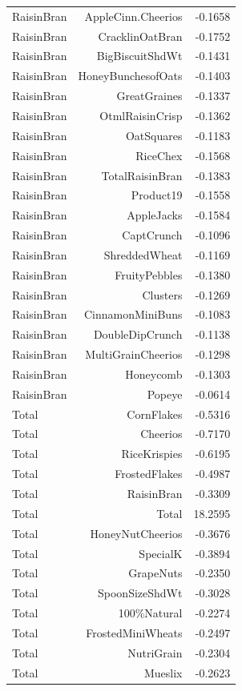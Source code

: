 \begin{longtable}{@{}lrr@{}}
RaisinBran & AppleCinn.Cheerios & -0.1658 \\
RaisinBran & CracklinOatBran & -0.1752 \\
RaisinBran & BigBiscuitShdWt & -0.1431 \\
RaisinBran & HoneyBunchesofOats & -0.1403 \\
RaisinBran & GreatGraines & -0.1337 \\
RaisinBran & OtmlRaisinCrisp & -0.1362 \\
RaisinBran & OatSquares & -0.1183 \\
RaisinBran & RiceChex & -0.1568 \\
RaisinBran & TotalRaisinBran & -0.1383 \\
RaisinBran & Product19 & -0.1558 \\
RaisinBran & AppleJacks & -0.1584 \\
RaisinBran & CaptCrunch & -0.1096 \\
RaisinBran & ShreddedWheat & -0.1169 \\
RaisinBran & FruityPebbles & -0.1380 \\
RaisinBran & Clusters & -0.1269 \\
RaisinBran & CinnamonMiniBuns & -0.1083 \\
RaisinBran & DoubleDipCrunch & -0.1138 \\
RaisinBran & MultiGrainCheerios & -0.1298 \\
RaisinBran & Honeycomb & -0.1303 \\
RaisinBran & Popeye & -0.0614 \\
Total & CornFlakes & -0.5316 \\
Total & Cheerios & -0.7170 \\
Total & RiceKrispies & -0.6195 \\
Total & FrostedFlakes & -0.4987 \\
Total & RaisinBran & -0.3309 \\
Total & Total & 18.2595 \\
Total & HoneyNutCheerios & -0.3676 \\
Total & SpecialK & -0.3894 \\
Total & GrapeNuts & -0.2350 \\
Total & SpoonSizeShdWt & -0.3028 \\
Total & 100\%Natural & -0.2274 \\
Total & FrostedMiniWheats & -0.2497 \\
Total & NutriGrain & -0.2304 \\
Total & Mueslix & -0.2623 \\

\end{longtable}
